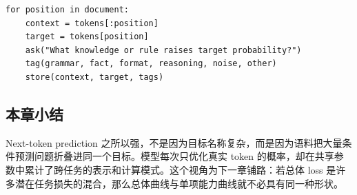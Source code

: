 \begin{lstlisting}[caption={把一段文本拆成 latent-task probe 的伪代码}]
for position in document:
    context = tokens[:position]
    target = tokens[position]
    ask("What knowledge or rule raises target probability?")
    tag(grammar, fact, format, reasoning, noise, other)
    store(context, target, tags)
\end{lstlisting}

\subsection{本章小结}

Next-token prediction 之所以强，不是因为目标名称复杂，而是因为语料把大量条件预测问题折叠进同一个目标。模型每次只优化真实 token 的概率，却在共享参数中累计了跨任务的表示和计算模式。这个视角为下一章铺路：若总体 loss 是许多潜在任务损失的混合，那么总体曲线与单项能力曲线就不必具有同一种形状。

